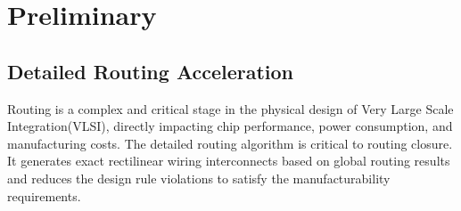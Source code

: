\section{Preliminary}\label{sec:background_0329}




\subsection{Detailed Routing Acceleration}

Routing is a complex and critical stage in the physical design of Very Large Scale Integration(VLSI), directly impacting chip performance, power consumption, and manufacturing costs. 
The detailed routing algorithm is critical to routing closure. It generates exact rectilinear wiring interconnects based on global routing results and reduces the design rule violations to satisfy the manufacturability requirements.

